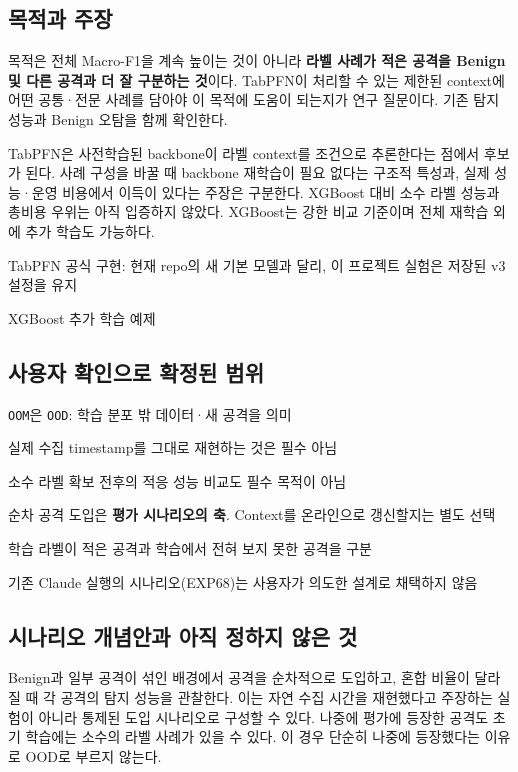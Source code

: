 \subsection{목적과 주장}
목적은 전체 Macro-F1을 계속 높이는 것이 아니라 \textbf{라벨 사례가 적은 공격을 Benign 및 다른 공격과 더 잘 구분하는 것}이다. TabPFN이 처리할 수 있는 제한된 context에 어떤 공통·전문 사례를 담아야 이 목적에 도움이 되는지가 연구 질문이다. 기존 탐지 성능과 Benign 오탐을 함께 확인한다.

TabPFN은 사전학습된 backbone이 라벨 context를 조건으로 추론한다는 점에서 후보가 된다. 사례 구성을 바꿀 때 backbone 재학습이 필요 없다는 구조적 특성과, 실제 성능·운영 비용에서 이득이 있다는 주장은 구분한다. XGBoost 대비 소수 라벨 성능과 총비용 우위는 아직 입증하지 않았다. XGBoost는 강한 비교 기준이며 전체 재학습 외에 추가 학습도 가능하다.

\par\noindent \textbullet\enspace TabPFN 공식 구현: 현재 repo의 새 기본 모델과 달리, 이 프로젝트 실험은 저장된 v3 설정을 유지


\par\noindent \textbullet\enspace XGBoost 추가 학습 예제


\subsection{사용자 확인으로 확정된 범위}
\par\noindent \textbullet\enspace \texttt{OOM}은 \texttt{OOD}: 학습 분포 밖 데이터·새 공격을 의미


\par\noindent \textbullet\enspace 실제 수집 timestamp를 그대로 재현하는 것은 필수 아님


\par\noindent \textbullet\enspace 소수 라벨 확보 전후의 적응 성능 비교도 필수 목적이 아님


\par\noindent \textbullet\enspace 순차 공격 도입은 \textbf{평가 시나리오의 축}. Context를 온라인으로 갱신할지는 별도 선택


\par\noindent \textbullet\enspace 학습 라벨이 적은 공격과 학습에서 전혀 보지 못한 공격을 구분


\par\noindent \textbullet\enspace 기존 Claude 실행의 시나리오(EXP68)는 사용자가 의도한 설계로 채택하지 않음


\subsection{시나리오 개념안과 아직 정하지 않은 것}
Benign과 일부 공격이 섞인 배경에서 공격을 순차적으로 도입하고, 혼합 비율이 달라질 때 각 공격의 탐지 성능을 관찰한다. 이는 자연 수집 시간을 재현했다고 주장하는 실험이 아니라 통제된 도입 시나리오로 구성할 수 있다. 나중에 평가에 등장한 공격도 초기 학습에는 소수의 라벨 사례가 있을 수 있다. 이 경우 단순히 나중에 등장했다는 이유로 OOD로 부르지 않는다.

